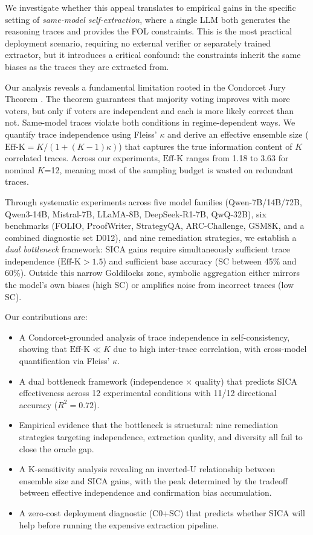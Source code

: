 \documentclass[11pt,a4paper]{article}
\newcommand{\effk}{\text{Eff-K}}
\begin{document}
We investigate whether this appeal translates to empirical gains in the specific setting of \emph{same-model self-extraction}, where a single LLM both generates the reasoning traces and provides the FOL constraints. This is the most practical deployment scenario, requiring no external verifier or separately trained extractor, but it introduces a critical confound: the constraints inherit the same biases as the traces they are extracted from.

Our analysis reveals a fundamental limitation rooted in the Condorcet Jury Theorem \cite{condorcet1785}. The theorem guarantees that majority voting improves with more voters, but only if voters are independent and each is more likely correct than not. Same-model traces violate both conditions in regime-dependent ways. We quantify trace independence using Fleiss' $\kappa$ and derive an effective ensemble size ($\effk = K / (1 + (K-1)\kappa)$) that captures the true information content of $K$ correlated traces. Across our experiments, $\effk$ ranges from 1.18 to 3.63 for nominal $K$=12, meaning most of the sampling budget is wasted on redundant traces.

Through systematic experiments across five model families (Qwen-7B/14B/72B, Qwen3-14B, Mistral-7B, LLaMA-8B, DeepSeek-R1-7B, QwQ-32B), six benchmarks (FOLIO, ProofWriter, StrategyQA, ARC-Challenge, GSM8K, and a combined diagnostic set D012), and nine remediation strategies, we establish a \emph{dual bottleneck} framework: SICA gains require simultaneously sufficient trace independence ($\effk > 1.5$) and sufficient base accuracy (SC between 45\% and 60\%). Outside this narrow Goldilocks zone, symbolic aggregation either mirrors the model's own biases (high SC) or amplifies noise from incorrect traces (low SC).

Our contributions are:
\begin{itemize}
\item A Condorcet-grounded analysis of trace independence in self-consistency, showing that $\effk \ll K$ due to high inter-trace correlation, with cross-model quantification via Fleiss' $\kappa$.
\item A dual bottleneck framework (independence $\times$ quality) that predicts SICA effectiveness across 12 experimental conditions with 11/12 directional accuracy ($R^2 = 0.72$).
\item Empirical evidence that the bottleneck is structural: nine remediation strategies targeting independence, extraction quality, and diversity all fail to close the oracle gap.
\item A K-sensitivity analysis revealing an inverted-U relationship between ensemble size and SICA gains, with the peak determined by the tradeoff between effective independence and confirmation bias accumulation.
\item A zero-cost deployment diagnostic (C0+SC) that predicts whether SICA will help before running the expensive extraction pipeline.
\end{itemize}
\end{document}

